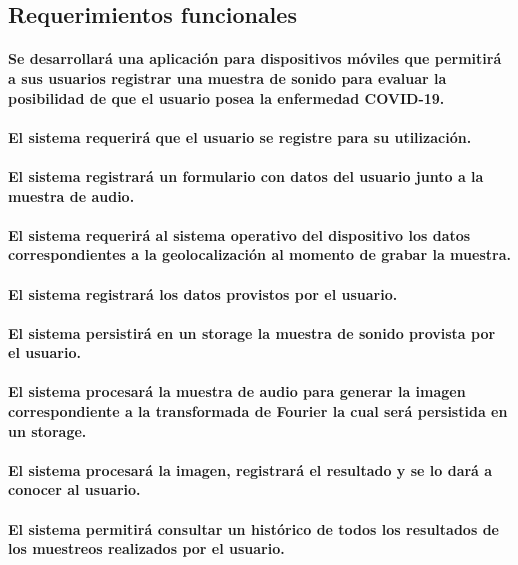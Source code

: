 \documentclass[a4paper,11pt,twocolumn]{article}
\begin{document}
\subsection{Requerimientos funcionales}
\paragraph{Se desarrollará una aplicación para dispositivos móviles que permitirá a sus usuarios registrar una muestra de sonido para evaluar la posibilidad de que el usuario posea la enfermedad COVID-19.}
\paragraph{El sistema requerirá que el usuario se registre para su utilización.}
\paragraph{El sistema registrará un formulario con datos del usuario junto a la muestra de audio.}
\paragraph{El sistema requerirá al sistema operativo del dispositivo los datos correspondientes a la geolocalización al momento de grabar la muestra.}
\paragraph{El sistema registrará los datos provistos por el usuario.}
\paragraph{El sistema persistirá en un storage la muestra de sonido provista por el usuario.}
\paragraph{El sistema procesará la muestra de audio para generar la imagen correspondiente a la transformada de Fourier la cual será persistida en un storage.}
\paragraph{El sistema procesará la imagen, registrará el resultado y se lo dará a conocer al usuario.}
\paragraph{El sistema permitirá consultar un histórico de todos los resultados de los muestreos realizados por el usuario.}
\end{document}
